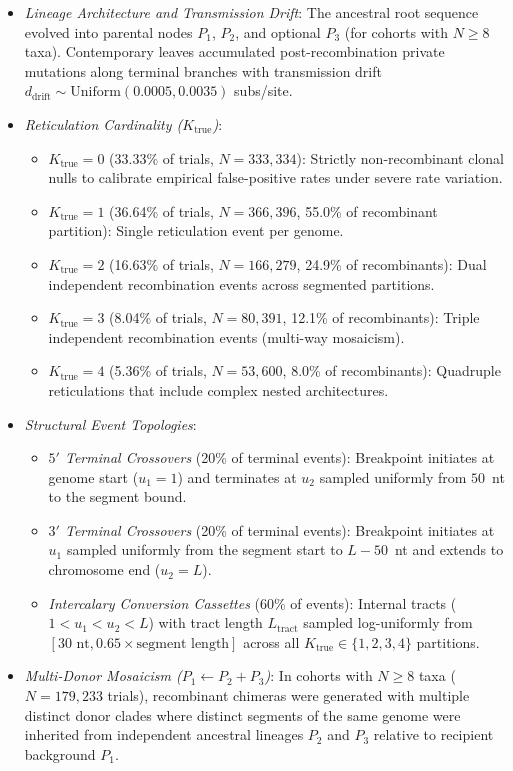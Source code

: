\begin{itemize}
\begin{itemize}
    \end{itemize}
    \item \emph{Lineage Architecture and Transmission Drift}: The ancestral root sequence evolved into parental nodes $P_1$, $P_2$, and optional $P_3$ (for cohorts with $N \ge 8$ taxa). Contemporary leaves accumulated post-recombination private mutations along terminal branches with transmission drift $d_{\mathrm{drift}} \sim \text{Uniform}(0.0005, 0.0035)$ subs/site.
    \item \emph{Reticulation Cardinality ($K_{\mathrm{true}}$)}:
    \begin{itemize}
        \item $K_{\mathrm{true}} = 0$ (33.33\% of trials, $N = 333{,}334$): Strictly non-recombinant clonal nulls to calibrate empirical false-positive rates under severe rate variation.
        \item $K_{\mathrm{true}} = 1$ (36.64\% of trials, $N = 366{,}396$, 55.0\% of recombinant partition): Single reticulation event per genome.
        \item $K_{\mathrm{true}} = 2$ (16.63\% of trials, $N = 166{,}279$, 24.9\% of recombinants): Dual independent recombination events across segmented partitions.
        \item $K_{\mathrm{true}} = 3$ (8.04\% of trials, $N = 80{,}391$, 12.1\% of recombinants): Triple independent recombination events (multi-way mosaicism).
        \item $K_{\mathrm{true}} = 4$ (5.36\% of trials, $N = 53{,}600$, 8.0\% of recombinants): Quadruple reticulations that include complex nested architectures.
    \end{itemize}
    \item \emph{Structural Event Topologies}:
    \begin{itemize}
        \item \textit{$5'$ Terminal Crossovers} (20\% of terminal events): Breakpoint initiates at genome start ($u_1 = 1$) and terminates at $u_2$ sampled uniformly from $50$~nt to the segment bound.
        \item \textit{$3'$ Terminal Crossovers} (20\% of terminal events): Breakpoint initiates at $u_1$ sampled uniformly from the segment start to $L - 50$~nt and extends to chromosome end ($u_2 = L$).
        \item \textit{Intercalary Conversion Cassettes} (60\% of events): Internal tracts ($1 < u_1 < u_2 < L$) with tract length $L_{\mathrm{tract}}$ sampled log-uniformly from $[30\text{ nt}, 0.65 \times \text{segment length}]$ across all $K_{\mathrm{true}} \in \{1, 2, 3, 4\}$ partitions.
    \end{itemize}
    \item \emph{Multi-Donor Mosaicism ($P_1 \leftarrow P_2 + P_3$)}:
    In cohorts with $N \ge 8$ taxa ($N = 179{,}233$ trials), recombinant chimeras were generated with multiple distinct donor clades where distinct segments of the same genome were inherited from independent ancestral lineages $P_2$ and $P_3$ relative to recipient background $P_1$.
\end{itemize}

